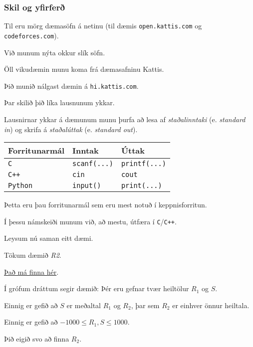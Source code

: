 {
    \frametitle{Skil og yfirferð}
    {
        \item<1-> Til eru mörg dæmasöfn á netinu (til dæmis \texttt{open.kattis.com} og \texttt{codeforces.com}).
        \item<2-> Við munum nýta okkur slík söfn.
        \item<3-> Öll vikudæmin munu koma frá dæmasafninu Kattis.
        \item<4-> Þið munið nálgast dæmin á \texttt{hi.kattis.com}.
        \item<5-> Þar skilið þið líka lausnunum ykkar.
    }
}

{
    {
        \item<1-> Lausnirnar ykkar á dæmunum munu þurfa að lesa af \emph{staðalinntaki} (e. \emph{standard in})
            og skrifa á \emph{staðalúttak} (e. \emph{standard out}).
        \item<2->[]
        \begin{tabular}{l l l}
            Forritunarmál & Inntak & Úttak\\
            \hline
            \texttt{C} & \texttt{scanf(...)} & \texttt{printf(...)}\\
            \texttt{C++} & \texttt{cin} & \texttt{cout}\\
            \texttt{Python} & \texttt{input()} & \texttt{print(...)}
        \end{tabular}

        \item<3-> Þetta eru þau forritunarmál sem eru mest notuð í keppnisforritun.
        \item<4-> Í þessu námskeiði munum við, að mestu, útfæra í \texttt{C}/\texttt{C++}.
        \item<5-> Leysum nú saman eitt dæmi.
    }
}

{
    {
        \item<1-> Tökum dæmið \emph{R2}.
        \item<2-> {\color{blue} \href{https://hi.kattis.com/problems/r2}{Það má finna hér}}.
        \item<3-> Í grófum dráttum segir dæmið: Þér eru gefnar tvær heiltölur $R_1$ og $S$.
        \item<4-> Einnig er gefið að $S$ er meðaltal $R_1$ og $R_2$, þar sem $R_2$ er einhver önnur heiltala.
        \item<5-> Einnig er gefið að $-1000 \leq R_1, S \leq 1000$.
        \item<6-> Þið eigið svo að finna $R_2$.
    }
}


